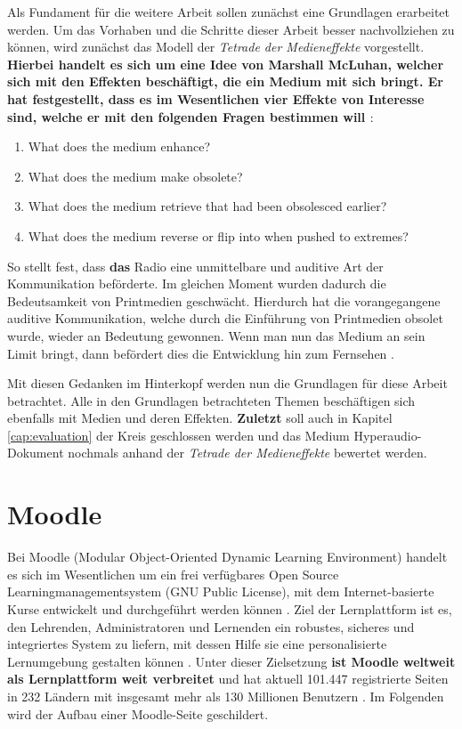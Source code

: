 \label{cha:grundlagen}
Als Fundament für die weitere Arbeit sollen zunächst eine Grundlagen erarbeitet werden. Um das Vorhaben und die Schritte dieser Arbeit besser nachvollziehen zu können, wird zunächst das Modell der \textit{Tetrade der Medieneffekte} vorgestellt. \textbf{Hierbei handelt es sich um eine Idee von Marshall McLuhan, welcher sich mit den Effekten beschäftigt, die ein Medium mit sich bringt. Er hat festgestellt, dass es im Wesentlichen vier Effekte von Interesse sind, welche er mit den folgenden Fragen bestimmen will \citep{mcluhan1977laws}}:

\begin{enumerate}
\item What does the medium enhance?
\item What does the medium make obsolete?
\item What does the medium retrieve that had been obsolesced earlier?
\item What does the medium reverse or flip into when pushed to extremes?
\end{enumerate}

So stellt \cite{mcluhan1977laws} fest, dass \textbf{das} Radio eine unmittelbare und auditive Art der Kommunikation beförderte. Im gleichen Moment wurden dadurch die Bedeutsamkeit von Printmedien geschwächt. Hierdurch hat die vorangegangene auditive Kommunikation, welche durch die Einführung von Printmedien obsolet wurde, wieder an Bedeutung gewonnen. Wenn man nun das Medium an sein Limit bringt, dann befördert dies die Entwicklung hin zum Fernsehen \citep{mcluhan1977laws}.

Mit diesen Gedanken im Hinterkopf werden nun die Grundlagen für diese Arbeit betrachtet. Alle in den Grundlagen betrachteten Themen beschäftigen sich ebenfalls mit Medien und deren Effekten. \textbf{Zuletzt} soll auch in Kapitel \ref{cap:evaluation} der Kreis geschlossen werden und das Medium Hyperaudio-Dokument nochmals anhand der \textit{Tetrade der Medieneffekte} bewertet werden.


\section{Moodle}
\label{sec:moodle}
Bei Moodle (Modular Object-Oriented Dynamic Learning Environment) handelt es sich im Wesentlichen um ein frei verfügbares Open Source Learningmanagementsystem (GNU Public License), mit dem Internet-basierte Kurse entwickelt und durchgeführt werden können \citep{moodle2015was}. Ziel der Lernplattform ist es, den Lehrenden, Administratoren und Lernenden ein robustes, sicheres und integriertes System zu liefern, mit dessen Hilfe sie eine personalisierte Lernumgebung gestalten können \citep{moodle2018about}. Unter dieser Zielsetzung \textbf{ist Moodle weltweit als Lernplattform weit verbreitet} und hat aktuell 101.447 registrierte Seiten in 232 Ländern mit insgesamt mehr als 130 Millionen Benutzern \citep{moodle2018stats}. Im Folgenden wird der Aufbau einer Moodle-Seite geschildert.

